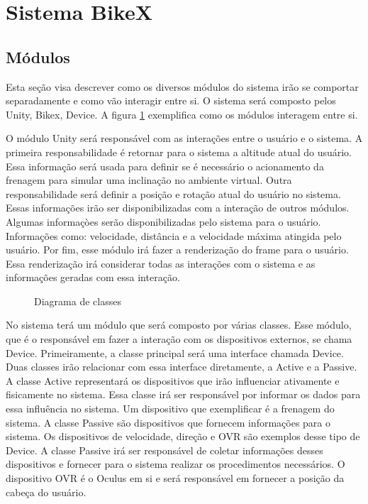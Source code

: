 \section{Sistema BikeX}
\label{sec:sistema_bikex}

\subsection{Módulos}
Esta seção visa descrever como os diversos módulos do sistema irão se comportar separadamente e como vão interagir entre si. O sistema será composto pelos Unity, Bikex, Device. A figura \ref{diagrama-classes} exemplifica como os módulos interagem entre si.

O módulo Unity será responsável com as interações entre o usuário e o sistema. A primeira responsabilidade é retornar para o sistema a altitude atual do usuário. Essa informação será usada para definir se é necessário o acionamento da frenagem para simular uma inclinação no ambiente virtual. Outra responsabilidade será definir a posição e rotação atual do usuário no sistema. Essas informações irão ser disponibilizadas com a interação de outros módulos. Algumas informaçòes serão disponibilizadas pelo sistema para o usuário. Informações como: velocidade, distância e a velocidade máxima atingida pelo usuário. Por fim, esse módulo irá fazer a renderização do frame para o usuário. Essa renderização irá considerar todas as interações com o sistema e as informações geradas com essa interação.

\begin{figure}[h]
  \centering
  \caption{Diagrama de classes}
  \label{diagrama-classes}
\end{figure}

No sistema terá um módulo que será composto por várias classes. Esse módulo, que é o responsável em fazer a interação com os dispositivos externos, se chama Device. Primeiramente, a classe principal será uma interface chamada Device. Duas classes irão relacionar com essa interface diretamente, a Active e a Passive. A classe Active representará os dispositivos que irão influenciar ativamente e fisicamente no sistema. Essa classe irá ser responsável por informar os dados para essa influência no sistema. Um dispositivo que exemplificar é a frenagem do sistema. A classe Passive são dispositivos que fornecem informações para o sistema. Os dispositivos de velocidade, direção e OVR são exemplos desse tipo de Device. A classe Passive irá ser responsável de coletar informações desses dispositivos e fornecer para o sistema realizar os procedimentos necessários. O dispositivo OVR é o Oculus em si e será responsável em fornecer a posição da cabeça do usuário.

